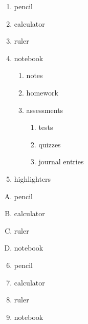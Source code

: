 \documentclass[11pt]{article}
\begin{document}
\begin{enumerate}
    \item pencil
    \item calculator
    \item ruler
    \item notebook
          \begin{enumerate}
              \item notes
              \item homework
              \item assessments
                    \begin{enumerate}
                        \item tests
                        \item quizzes
                        \item journal entries
                    \end{enumerate}
          \end{enumerate}
    \item highlighters
\end{enumerate}

\vspace{1cm}

\begin{enumerate}[A.]
    \item pencil
    \item calculator
    \item ruler
    \item notebook
\end{enumerate}

\vspace{1cm}

\begin{enumerate} 
    \setcounter{enumi}{5}
    \item pencil
    \item calculator
    \item ruler
    \item notebook
\end{enumerate}

\pagebreak
\end{document}
